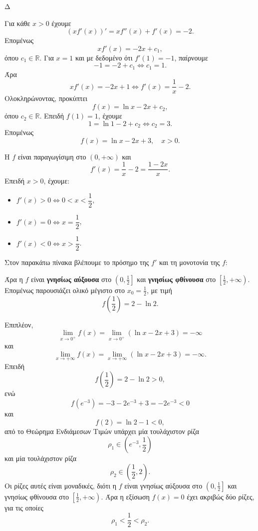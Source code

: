 \begin{thema}{Δ}
\begin{erwthma}
\item Για κάθε $x>0$ έχουμε
\[
\left(xf'(x)\right)'=xf''(x)+f'(x)=-2.
\]
Επομένως
\[
xf'(x)=-2x+c_1,
\]
όπου $c_1\in\mathbb{R}$. Για $x=1$ και με δεδομένο ότι $f'(1)=-1$, παίρνουμε
\[
-1=-2+c_1
\Leftrightarrow
c_1=1.
\]
Άρα
\[
xf'(x)=-2x+1
\Leftrightarrow
f'(x)=\frac{1}{x}-2.
\]
Ολοκληρώνοντας, προκύπτει
\[
f(x)=\ln x-2x+c_2,
\]
όπου $c_2\in\mathbb{R}$. Επειδή $f(1)=1$, έχουμε
\[
1=\ln1-2+c_2
\Leftrightarrow
c_2=3.
\]
Επομένως
\[
{f(x)=\ln x-2x+3},\quad x>0.
\]

\item Η $f$ είναι παραγωγίσιμη στο $(0,+\infty)$ και
\[
f'(x)=\frac{1}{x}-2=\frac{1-2x}{x}.
\]
Επειδή $x>0$, έχουμε:
\begin{itemize}
\item $f'(x)>0\Leftrightarrow 0<x<\dfrac{1}{2}$,
\item $f'(x)=0\Leftrightarrow x=\dfrac{1}{2}$,
\item $f'(x)<0\Leftrightarrow x>\dfrac{1}{2}$.
\end{itemize}
Στον παρακάτω πίνακα βλέπουμε το πρόσημο της $f'$ και τη μονοτονία της $f$:
\begin{center}
\end{center}

Άρα η $f$ είναι \textbf{γνησίως αύξουσα} στο $\left(0,\frac{1}{2}\right]$ και \textbf{γνησίως φθίνουσα} στο $\left[\frac{1}{2},+\infty\right)$. Επομένως παρουσιάζει ολικό μέγιστο στο $x_0=\frac{1}{2}$, με τιμή
\[
{f\left(\frac{1}{2}\right)=2-\ln2}.
\]

Επιπλέον,
\[
\lim_{x\to0^+}f(x)
=\lim_{x\to0^+}\left(\ln x-2x+3\right)
=-\infty
\]
και
\[
\lim_{x\to+\infty}f(x)
=\lim_{x\to+\infty}\left(\ln x-2x+3\right)
=-\infty.
\]
Επειδή
\[
f\left(\frac{1}{2}\right)=2-\ln2>0,
\]
ενώ
\[
f\left(e^{-3}\right)
=-3-2e^{-3}+3
=-2e^{-3}<0
\]
και
\[
f(2)=\ln2-1<0,
\]
από το Θεώρημα Ενδιάμεσων Τιμών υπάρχει μία τουλάχιστον ρίζα
\[
\rho_1\in\left(e^{-3},\frac{1}{2}\right)
\]
και μία τουλάχιστον ρίζα
\[
\rho_2\in\left(\frac{1}{2},2\right).
\]
Οι ρίζες αυτές είναι μοναδικές, διότι η $f$ είναι γνησίως αύξουσα στο $\left(0,\frac{1}{2}\right]$ και γνησίως φθίνουσα στο $\left[\frac{1}{2},+\infty\right)$. Άρα η εξίσωση $f(x)=0$ έχει ακριβώς δύο ρίζες, για τις οποίες
\[
{\rho_1<\frac{1}{2}<\rho_2}.
\]


\end{erwthma}
\end{thema}
